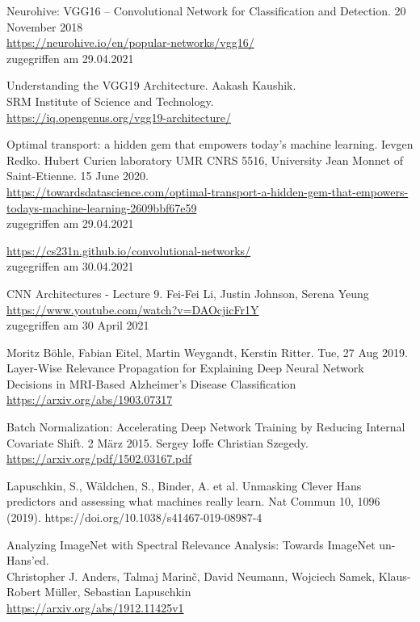 \begin{thebibliography}{}
		Neurohive: VGG16 – Convolutional Network for Classification and Detection. 20 November 2018\\
		\url{https://neurohive.io/en/popular-networks/vgg16/}\\
		zugegriffen am 29.04.2021
		
		Understanding the VGG19 Architecture. Aakash Kaushik.\\
		SRM Institute of Science and Technology.\\
		\url{https://iq.opengenus.org/vgg19-architecture/}
		
		Optimal transport: a hidden gem that empowers today’s machine learning. Ievgen Redko. Hubert Curien laboratory UMR CNRS 5516, University Jean Monnet of Saint-Etienne. 15 June 2020.\\
		\url{https://towardsdatascience.com/optimal-transport-a-hidden-gem-that-empowers-todays-machine-learning-2609bbf67e59}\\
		zugegriffen am 29.04.2021
		
		\url{https://cs231n.github.io/convolutional-networks/}\\
		zugegriffen am 30.04.2021
		
		CNN Architectures - Lecture 9. Fei-Fei Li, Justin Johnson, Serena Yeung
		\url{https://www.youtube.com/watch?v=DAOcjicFr1Y}\\
		zugegriffen am 30 April 2021
		
		Moritz Böhle, Fabian Eitel, Martin Weygandt, Kerstin Ritter. Tue, 27 Aug 2019.
		Layer-Wise Relevance Propagation for Explaining Deep Neural Network Decisions in MRI-Based Alzheimer's Disease Classification
		\url{https://arxiv.org/abs/1903.07317}
		
		Batch Normalization: Accelerating Deep Network Training by Reducing Internal Covariate Shift. 2 März 2015. Sergey Ioffe Christian Szegedy.
		\url{https://arxiv.org/pdf/1502.03167.pdf}
		
		 Lapuschkin, S., Wäldchen, S., Binder, A. et al. Unmasking Clever Hans predictors and assessing what machines really learn. Nat Commun 10, 1096 (2019). https://doi.org/10.1038/s41467-019-08987-4
		
		 Analyzing ImageNet with Spectral Relevance Analysis: Towards ImageNet un-Hans'ed.\\
		Christopher J. Anders, Talmaj Marinč, David Neumann, Wojciech Samek, Klaus-Robert Müller, Sebastian Lapuschkin\\
		\url{https://arxiv.org/abs/1912.11425v1}
		

\end{thebibliography}

